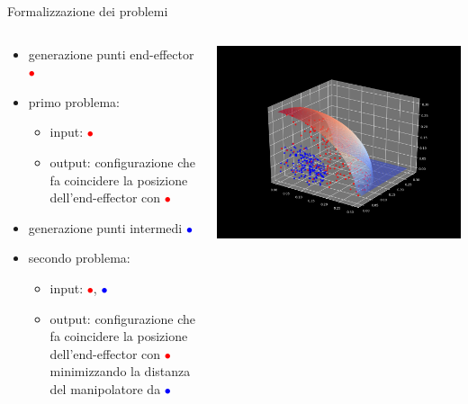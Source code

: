 \begin{frame}{Formalizzazione dei problemi}
\begin{columns}
\begin{column}{0.5\textwidth}
\begin{itemize}
    \item<1-> generazione punti end-effector \textcolor{red}{$\bullet$}
    \item<2-> primo problema:
    \begin{itemize}
        \item<3-> input: \textcolor{red}{$\bullet$}
        \item<4-> output: configurazione che fa coincidere la posizione dell'end-effector con \textcolor{red}{$\bullet$}
    \end{itemize}
    \item<5-> generazione punti intermedi  \textcolor{blue}{$\bullet$}
    \item<6-> secondo problema:
    \begin{itemize}
        \item<7-> input: \textcolor{red}{$\bullet$}, \textcolor{blue}{$\bullet$}
        \item<8-> output: configurazione che fa coincidere la posizione dell'end-effector con \textcolor{red}{$\bullet$} minimizzando la distanza del manipolatore da \textcolor{blue}{$\bullet$}
    \end{itemize}
\end{itemize}
\end{column}
\begin{column}{0.8\textwidth}
\includegraphics[height=0.9\textheight,trim={0 0 0cm 0},clip]{slide/img_cinematica_inversa/spazio_raggiungibilita.png}
\end{column}
\end{columns}

\end{frame}
